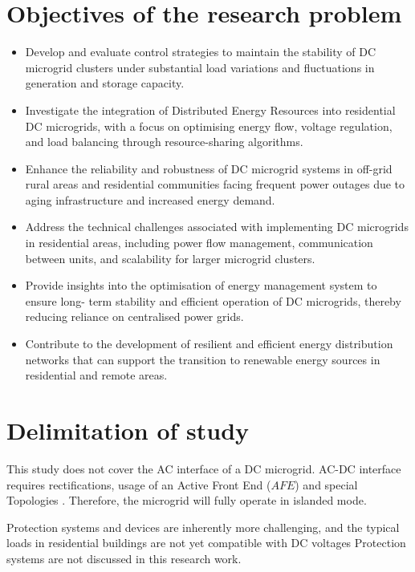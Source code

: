 \section{Objectives of the research problem}

\begin{itemize}[nolistsep]
	\item Develop and evaluate control strategies to maintain the stability of DC microgrid
	clusters under substantial load variations and fluctuations in generation and storage
	capacity.
	\item Investigate the integration of Distributed Energy Resources into residential DC
	microgrids, with a focus on optimising energy flow, voltage regulation, and load
	balancing through resource-sharing algorithms.
	\item Enhance the reliability and robustness of DC microgrid systems in off-grid rural areas
	and residential communities facing frequent power outages due to aging infrastructure
	and increased energy demand.
	\item Address the technical challenges associated with implementing DC microgrids in
	residential areas, including power flow management, communication between units,
	and scalability for larger microgrid clusters.
	\item Provide insights into the optimisation of energy management system to ensure long-
	term stability and efficient operation of DC microgrids, thereby reducing reliance on
	centralised power grids.
	\item Contribute to the development of resilient and efficient energy distribution networks
	that can support the transition to renewable energy sources in residential and remote
	areas.
\end{itemize}
\section{Delimitation of study}
This study does not cover the AC interface of a DC microgrid. AC-DC interface requires rectifications, usage of an Active Front End ($AFE$) and special Topologies \cite{Dinesh2017}. Therefore, the microgrid will fully operate in islanded mode.\par
Protection systems and devices are inherently more challenging, and the typical loads in residential buildings are not yet compatible with DC voltages \cite{RodriguezDiaz2017} Protection systems are not discussed in this research work.
